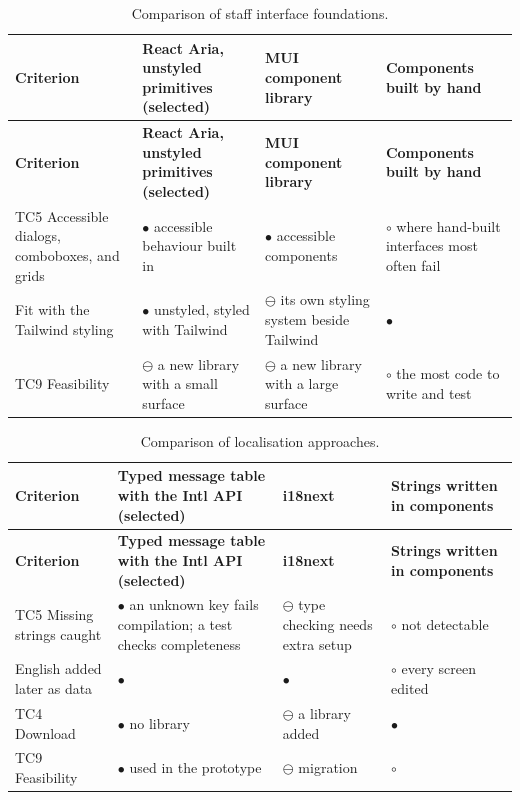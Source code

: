 {\small
\begin{longtable}{|>{\raggedright\arraybackslash}p{}|>{\raggedright\arraybackslash}p{}|>{\raggedright\arraybackslash}p{}|>{\raggedright\arraybackslash}p{}|}
\caption{Comparison of staff interface foundations.} \\
\hline
\textbf{Criterion} & \textbf{React Aria, unstyled primitives (selected)\cite{r146}} & \textbf{MUI component library\cite{r177}} & \textbf{Components built by hand} \\ \hline
\endfirsthead
\hline
\textbf{Criterion} & \textbf{React Aria, unstyled primitives (selected)\cite{r146}} & \textbf{MUI component library\cite{r177}} & \textbf{Components built by hand} \\ \hline
\endhead
TC5 Accessible dialogs, comboboxes, and grids & $\bullet$ accessible behaviour built in & $\bullet$ accessible components & $\circ$ where hand-built interfaces most often fail \\ \hline
Fit with the Tailwind styling & $\bullet$ unstyled, styled with Tailwind & $\ominus$ its own styling system beside Tailwind & $\bullet$ \\ \hline
TC9 Feasibility & $\ominus$ a new library with a small surface & $\ominus$ a new library with a large surface & $\circ$ the most code to write and test \\ \hline
\end{longtable}
}

{\small
\begin{longtable}{|>{\raggedright\arraybackslash}p{}|>{\raggedright\arraybackslash}p{}|>{\raggedright\arraybackslash}p{}|>{\raggedright\arraybackslash}p{}|}
\caption{Comparison of localisation approaches.} \\
\hline
\textbf{Criterion} & \textbf{Typed message table with the Intl API (selected)} & \textbf{i18next\cite{r178}} & \textbf{Strings written in components} \\ \hline
\endfirsthead
\hline
\textbf{Criterion} & \textbf{Typed message table with the Intl API (selected)} & \textbf{i18next\cite{r178}} & \textbf{Strings written in components} \\ \hline
\endhead
TC5 Missing strings caught & $\bullet$ an unknown key fails compilation; a test checks completeness & $\ominus$ type checking needs extra setup & $\circ$ not detectable \\ \hline
English added later as data & $\bullet$ & $\bullet$ & $\circ$ every screen edited \\ \hline
TC4 Download & $\bullet$ no library & $\ominus$ a library added & $\bullet$ \\ \hline
TC9 Feasibility & $\bullet$ used in the prototype & $\ominus$ migration & $\circ$ \\ \hline
\end{longtable}
}

